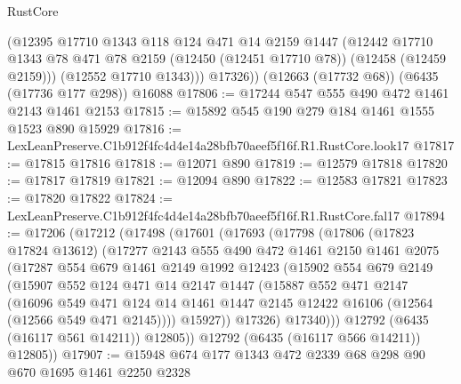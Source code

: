 \begin{lexlean}{RustCore}
\begin{coremodule}
          (@12395
            @17710
            @1343
            @118
            @124
            @471
            @14
            @2159
            @1447
            (@12442
              @17710
              @1343
              @78
              @471
              @78
              @2159
              (@12450 (@12451 @17710 @78))
              (@12458 (@12459 @2159)))
            (@12552 @17710 @1343)))
        @17326))
    (@12663 (@17732 @68))
    (@6435 (@17736 @177 @298))
    @16088
@17806 := @17244 @547 @555 @490 @472 @1461 @2143 @1461 @2153
@17815 := @15892 @545 @190 @279 @184 @1461 @1555 @1523 @890 @15929
@17816 := LexLeanPreserve.C1b912f4fc4d4e14a28bfb70aeef5f16f.R1.RustCore.look17
@17817 := @17815 @17816
@17818 := @12071 @890
@17819 := @12579 @17818
@17820 := @17817 @17819
@17821 := @12094 @890
@17822 := @12583 @17821
@17823 := @17820 @17822
@17824 := LexLeanPreserve.C1b912f4fc4d4e14a28bfb70aeef5f16f.R1.RustCore.fal17
@17894 := @17206
    (@17212
      (@17498
        (@17601
          (@17693
            (@17798
              (@17806
                (@17823 @17824 @13612)
                (@17277
                  @2143
                  @555
                  @490
                  @472
                  @1461
                  @2150
                  @1461
                  @2075
                  (@17287
                    @554
                    @679
                    @1461
                    @2149
                    @1992
                    @12423
                    (@15902
                      @554
                      @679
                      @2149
                      (@15907
                        @552
                        @124
                        @471
                        @14
                        @2147
                        @1447
                        (@15887
                          @552
                          @471
                          @2147
                          (@16096
                            @549
                            @471
                            @124
                            @14
                            @1461
                            @1447
                            @2145
                            @12422
                            @16106
                            (@12564 (@12566 @549 @471 @2145))))
                        @15927))
                    @17326)
                  @17340)))
            @12792
            (@6435 (@16117 @561 @14211))
            @12805))
        @12792
        (@6435 (@16117 @566 @14211))
        @12805))
@17907 := @15948 @674 @177 @1343 @472 @2339 @68 @298 @90 @670 @1695 @1461 @2250 @2328

\end{coremodule}
\end{lexlean}

